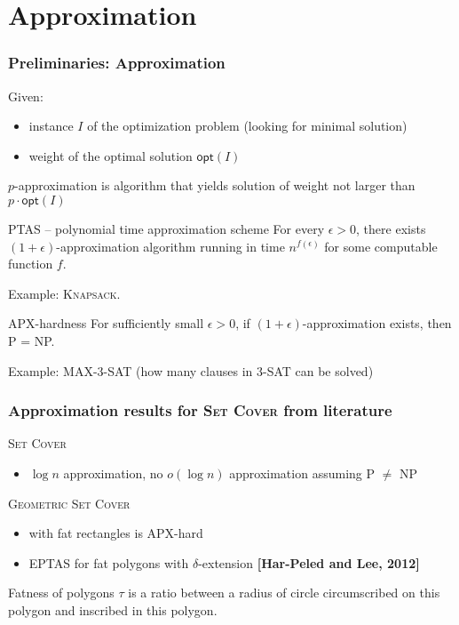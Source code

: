 \documentclass{beamer}
\begin{document}
\section{Approximation}
\begin{frame}
\frametitle{Preliminaries: Approximation}
Given:
\begin{itemize}
\item instance $I$ of the optimization problem (looking for minimal solution)
\item weight of the optimal solution $\mathsf{opt}(I)$
\end{itemize}
$p$-approximation is algorithm that yields solution of weight not larger than
$p\cdot \mathsf{opt}(I)$
\begin{block}{PTAS -- polynomial time approximation scheme}
For every $\epsilon > 0$, there exists $(1+\epsilon)$-approximation
algorithm running in time $n^{f(\epsilon)}$ for some computable function $f$.

Example: \textsc{Knapsack}.

\end{block}

\begin{block}{APX-hardness}
For sufficiently small $\epsilon > 0$,
if $(1+\epsilon)$-approximation exists, then P = NP.

Example: \textsc{MAX-3-SAT} (how many clauses in 3-SAT can be solved)
\end{block}


\end{frame}
\begin{frame}
\frametitle{Approximation results for \textsc{Set Cover} from literature}
\textsc{Set Cover}
\begin{itemize}
\item $\log n$ approximation, no $o(\log n)$ approximation assuming P $\neq$ NP
\end{itemize}

\textsc{Geometric Set Cover}
\begin{itemize}
\item with fat rectangles is APX-hard
\item EPTAS for fat polygons with $\delta$-extension \textbf{[Har-Peled and Lee, 2012]}
\end{itemize}


\begin{definition}{
Fatness of polygons $\tau$ is a ratio between a radius of circle
circumscribed on this polygon and inscribed in this polygon.
}\end{definition}


\end{frame}
\end{document}
